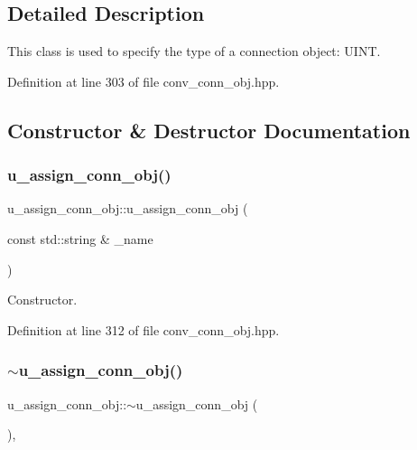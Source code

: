 \subsection{Detailed Description}
This class is used to specify the type of a connection object\+: U\+I\+NT. 

Definition at line 303 of file conv\+\_\+conn\+\_\+obj.\+hpp.



\subsection{Constructor \& Destructor Documentation}
\mbox{\label{classu__assign__conn__obj_a4e2dfec62f384099aecd24d323c3bb04}} 
\subsubsection{\texorpdfstring{u\+\_\+assign\+\_\+conn\+\_\+obj()}{u\_assign\_conn\_obj()}}
{\footnotesize\ttfamily u\+\_\+assign\+\_\+conn\+\_\+obj\+::u\+\_\+assign\+\_\+conn\+\_\+obj (\begin{DoxyParamCaption}\item[{const std\+::string \&}]{\+\_\+name }\end{DoxyParamCaption})\hspace{0.3cm}{\ttfamily [inline]}}



Constructor. 



Definition at line 312 of file conv\+\_\+conn\+\_\+obj.\+hpp.

\mbox{\label{classu__assign__conn__obj_a6a204b1f4b3a6db41b8d0c70e1762827}} 
\subsubsection{\texorpdfstring{$\sim$u\+\_\+assign\+\_\+conn\+\_\+obj()}{~u\_assign\_conn\_obj()}}
{\footnotesize\ttfamily u\+\_\+assign\+\_\+conn\+\_\+obj\+::$\sim$u\+\_\+assign\+\_\+conn\+\_\+obj (\begin{DoxyParamCaption}{ }\end{DoxyParamCaption})\hspace{0.3cm}{\ttfamily [override]}, {\ttfamily [default]}}



